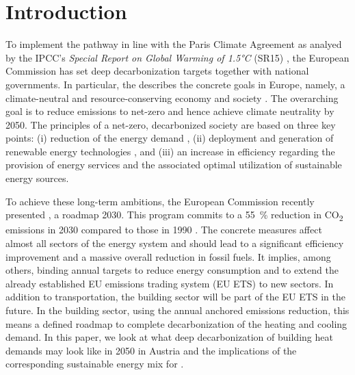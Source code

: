 \section{Introduction}
To implement the pathway in line with the Paris Climate Agreement \cite{agreement2015paris} as analyed by the IPCC's \emph{Special Report on Global Warming of 1.5°C} (SR15) \cite{book}, the European Commission has set deep decarbonization targets together with national governments. In particular, the  describes the concrete goals in Europe, namely, a climate-neutral and resource-conserving economy and society \cite{kemfert2019green}\deleted{)}. The overarching goal is to reduce  emissions to net-zero and hence achieve climate neutrality by 2050. The principles of a net-zero, decarbonized society are based on three key points: (i) reduction of the energy demand \cite{grubler2018low}\deleted{)}, (ii) deployment and generation of renewable energy technologies \cite{bakhtavar2020assessment}\deleted{)}, and (iii) an increase in efficiency regarding the provision of energy services and the associated optimal utilization of sustainable energy sources.\vspace{0.3cm}

To achieve these long-term ambitions, the European Commission recently presented , a  roadmap   2030. This program commits to a \SI{55}{\%} reduction in CO\textsubscript{2} emissions in 2030 compared to  those in 1990 \cite{european_commission_european_2019}. The concrete measures affect almost all sectors of the energy system and should lead to a significant efficiency improvement and a massive overall reduction in fossil fuels. It implies, among others, binding annual targets to reduce energy consumption and to extend the already established EU emissions trading system (EU ETS) to new sectors. In addition to transportation, the building sector will be part of the EU ETS in the future. In the building sector, using the annual anchored emissions reduction, this means a defined roadmap to complete decarbonization of the heating and cooling demand. In this paper, we look at what deep decarbonization of building heat demands may look like in 2050 in Austria and the implications of the corresponding sustainable energy mix for .

